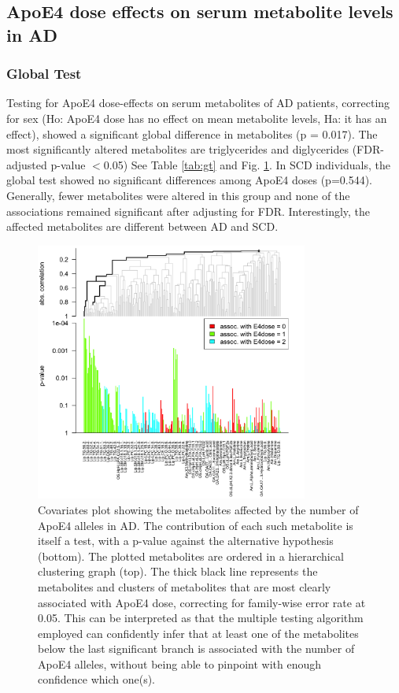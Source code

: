 \documentclass{amsart}
\begin{document}
\newpage \subsection{ApoE4 dose effects on serum metabolite levels in AD}
\subsubsection{Global Test}
Testing for ApoE4 dose-effects on serum metabolites of AD patients, correcting for sex (Ho: ApoE4 dose has no effect on mean metabolite levels, Ha: it has an effect), showed a significant global difference in metabolites (p = 0.017). The most significantly altered metabolites are triglycerides and diglycerides (FDR-adjusted p-value $<$0.05) See Table \ref{tab:gt} and Fig. \ref{plot:gt}. In SCD individuals, the global test showed no significant differences among ApoE4 doses (p=0.544). Generally, fewer metabolites were altered in this group and none of the associations remained significant after adjusting for FDR. Interestingly, the affected metabolites are different between AD and SCD.
\begin{figure}[H]
  \includegraphics[width=0.8\textwidth]{figures/gt2.png}
    \caption{Covariates plot showing the metabolites affected by the number of ApoE4 alleles in AD. The contribution of each such metabolite is itself a test, with a p-value against the alternative hypothesis (bottom). The plotted metabolites are ordered in a hierarchical clustering graph (top). The thick black line represents the metabolites and clusters of metabolites that are most clearly associated with ApoE4 dose, correcting for family-wise error rate at 0.05. This can be interpreted as that the multiple testing algorithm employed can confidently infer that at least one of the metabolites below the last significant branch is associated with the number of ApoE4 alleles, without being able to pinpoint with enough confidence which one(s).}
  \label{plot:gt}
\end{figure}
\end{document}
